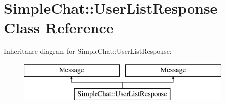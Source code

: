 \hypertarget{classSimpleChat_1_1UserListResponse}{\section{Simple\-Chat\-:\-:User\-List\-Response Class Reference}
\label{classSimpleChat_1_1UserListResponse}
}
Inheritance diagram for Simple\-Chat\-:\-:User\-List\-Response\-:\begin{figure}[H]
\begin{center}
\leavevmode
\includegraphics[height=2.000000cm]{classSimpleChat_1_1UserListResponse}
\end{center}
\end{figure}
